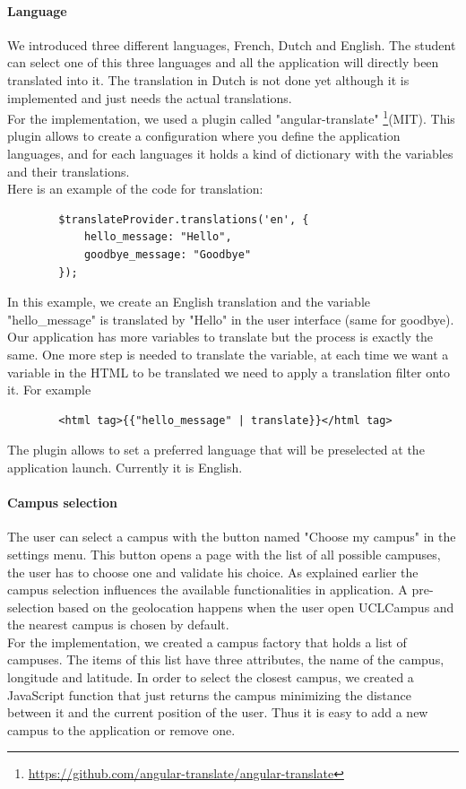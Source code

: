 \documentclass{eplmastersthesis}
\begin{document}
\paragraph{Language} We introduced three different languages, French, Dutch and English. The student can select one of this three languages and all the application will directly been translated into it. The translation in Dutch is not done yet although it is implemented and just needs the actual translations. \\
For the implementation, we used a plugin called "angular-translate" \footnote{\url{https://github.com/angular-translate/angular-translate}}(MIT). This plugin allows to create a configuration where you define the application languages, and for each languages it holds a kind of dictionary with the variables and their translations.\\
Here is an example of the code for translation:
\begin{verbatim}
        $translateProvider.translations('en', {
            hello_message: "Hello",
            goodbye_message: "Goodbye"
        });
\end{verbatim}
In this example, we create an English translation and the variable "hello\_message" is translated by "Hello" in the user interface (same for goodbye). Our application has more variables to translate but the process is exactly the same. One more step is needed to translate the variable, at each time we want a variable in the HTML to be translated we need to apply a translation filter onto it. For example 
\begin{verbatim}
		<html tag>{{"hello_message" | translate}}</html tag> 
\end{verbatim}
The plugin allows to set a preferred language that will be preselected at the application launch. Currently it is English.
\paragraph{Campus selection} The user can select a campus with the button named "Choose my campus" in the settings menu. This button opens a page with the list of all possible campuses, the user has to choose one and validate his choice. As explained earlier the campus selection influences the available functionalities in application. A pre-selection based on the geolocation happens when the user open UCLCampus and the nearest campus is chosen by default.\\
For the implementation, we created a campus factory that holds a list of campuses. The items of this list have three attributes, the name of the campus, longitude and latitude. In order to select the closest campus, we created a JavaScript function that just returns the campus minimizing the distance between it and the current position of the user. Thus it is easy to add a new campus to the application or remove one.
\end{document}

